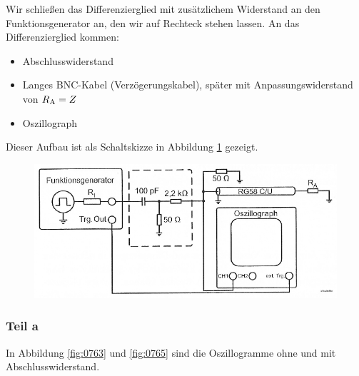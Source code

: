 Wir schließen das Differenzierglied mit zusätzlichem Widerstand an den
Funktionsgenerator an, den wir auf Rechteck stehen lassen. An das
Differenzierglied kommen:
%
\begin{itemize}
	\item
		Abschlusswiderstand
	\item
		Langes BNC-Kabel (Verzögerungskabel), später mit Anpassungswiderstand
		von $R_\text A = Z$
	\item
		Oszillograph
\end{itemize}

Dieser Aufbau ist als Schaltskizze in Abbildung \ref{fig:1-8} gezeigt.

\begin{figure}[htbp]
	\centering
	\includegraphics[width=\textwidth]{Schaltplan/1-8.png}
	\caption{%
		\cite[Abbildung~1.8]{physik313-Anleitung}
	}
	\label{fig:1-8}
\end{figure}


\FloatBarrier
\subsubsection{Teil a}

In Abbildung \ref{fig:0763} und \ref{fig:0765} sind die Oszillogramme ohne und
mit Abschlusswiderstand.

